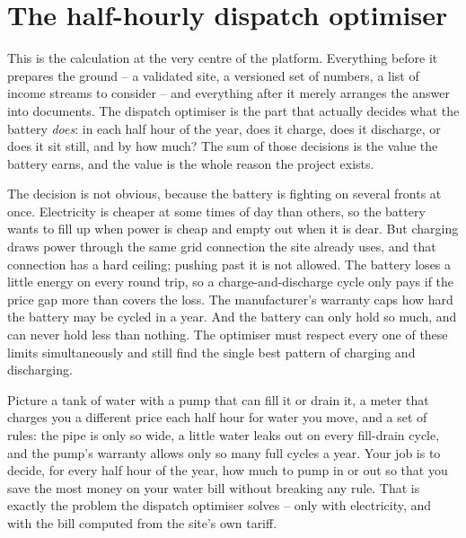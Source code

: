 \chapter{The half-hourly dispatch optimiser}
\label{ch:dispatch}


This is the calculation at the very centre of the platform. Everything before it prepares the ground -- a validated site, a versioned set of numbers, a list of income streams to consider -- and everything after it merely arranges the answer into documents. The dispatch optimiser is the part that actually decides what the battery \emph{does}: in each half hour of the year, does it charge, does it discharge, or does it sit still, and by how much? The sum of those decisions is the value the battery earns, and the value is the whole reason the project exists.

The decision is not obvious, because the battery is fighting on several fronts at once. Electricity is cheaper at some times of day than others, so the battery wants to fill up when power is cheap and empty out when it is dear. But charging draws power through the same grid connection the site already uses, and that connection has a hard ceiling; pushing past it is not allowed. The battery loses a little energy on every round trip, so a charge-and-discharge cycle only pays if the price gap more than covers the loss. The manufacturer's warranty caps how hard the battery may be cycled in a year. And the battery can only hold so much, and can never hold less than nothing. The optimiser must respect every one of these limits simultaneously and still find the single best pattern of charging and discharging.

\begin{plainnote}
Picture a tank of water with a pump that can fill it or drain it, a meter that charges you a different price each half hour for water you move, and a set of rules: the pipe is only so wide, a little water leaks out on every fill-drain cycle, and the pump's warranty allows only so many full cycles a year. Your job is to decide, for every half hour of the year, how much to pump in or out so that you save the most money on your water bill without breaking any rule. That is exactly the problem the dispatch optimiser solves -- only with electricity, and with the bill computed from the site's own tariff.
\end{plainnote}


